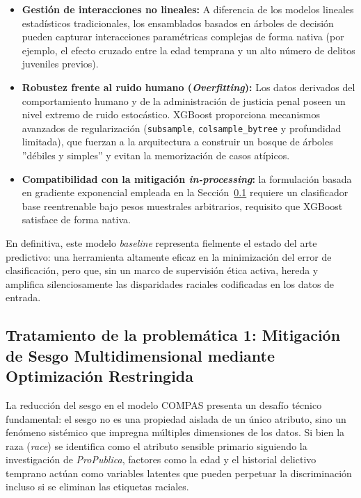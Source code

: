 \documentclass[11pt,a4paper]{article}
\begin{document}
\begin{itemize}
    \item \textbf{Gestión de interacciones no lineales:} A diferencia de los modelos lineales estadísticos tradicionales, los ensamblados basados en árboles de decisión pueden capturar interacciones paramétricas complejas de forma nativa (por ejemplo, el efecto cruzado entre la edad temprana y un alto número de delitos juveniles previos).
    \item \textbf{Robustez frente al ruido humano (\textit{Overfitting}):} Los datos derivados del comportamiento humano y de la administración de justicia penal poseen un nivel extremo de ruido estocástico. XGBoost proporciona mecanismos avanzados de regularización (\texttt{subsample}, \texttt{colsample\_bytree} y profundidad limitada), que fuerzan a la arquitectura a construir un bosque de árboles ''débiles y simples'' y evitan la memorización de casos atípicos.
    \item \textbf{Compatibilidad con la mitigación \textit{in-processing}:} la formulación basada en gradiente exponencial empleada en la Sección~\ref{subsec:mitigacion_sesgo} requiere un clasificador base reentrenable bajo pesos muestrales arbitrarios, requisito que XGBoost satisface de forma nativa.
\end{itemize}

En definitiva, este modelo \textit{baseline} representa fielmente el estado del arte predictivo: una herramienta altamente eficaz en la minimización del error de clasificación, pero que, sin un marco de supervisión ética activa, hereda y amplifica silenciosamente las disparidades raciales codificadas en los datos de entrada.


\subsection{Tratamiento de la problemática 1: Mitigación de Sesgo Multidimensional mediante Optimización Restringida}
\label{subsec:mitigacion_sesgo}

La reducción del sesgo en el modelo COMPAS presenta un desafío técnico fundamental: el sesgo no es una propiedad aislada de un único atributo, sino un fenómeno sistémico que impregna múltiples dimensiones de los datos. Si bien la raza (\textit{race}) se identifica como el atributo sensible primario siguiendo la investigación de \textit{ProPublica}, factores como la edad y el historial delictivo temprano actúan como variables latentes que pueden perpetuar la discriminación incluso si se eliminan las etiquetas raciales.
\end{document}
